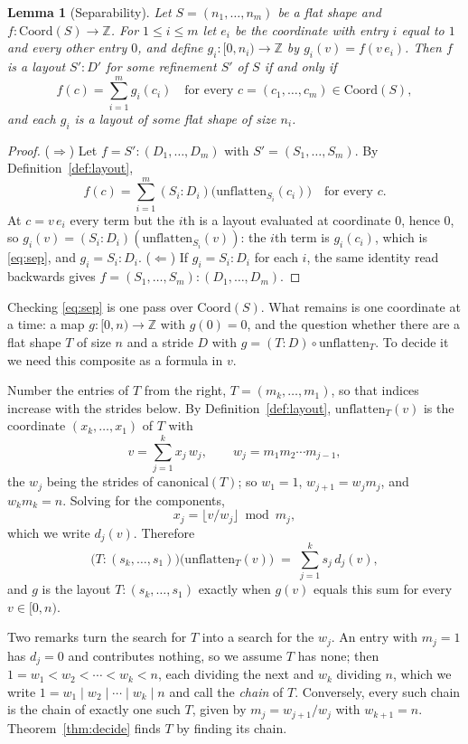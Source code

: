\documentclass[11pt]{article}
\newtheorem{lemma}{Lemma}
\theoremstyle{definition}
\newcommand{\Z}{\mathbb{Z}}
\begin{document}
\begin{lemma}[Separability]\label{lem:separable}
Let $S = (n_1,\dots,n_m)$ be a flat shape and $f : \mathrm{Coord}(S) \to \Z$.
For $1 \le i \le m$ let $e_i$ be the coordinate with entry $i$ equal to $1$
and every other entry $0$, and define $g_i : [0,n_i) \to \Z$ by
$g_i(v) = f(v\,e_i)$. Then $f$ is a layout $S'{:}D'$ for some refinement $S'$
of $S$ if and only if
\begin{equation}\label{eq:sep}
f(c) = \sum_{i=1}^{m} g_i(c_i)
\quad\text{for every } c = (c_1,\dots,c_m) \in \mathrm{Coord}(S),
\end{equation}
and each $g_i$ is a layout of some flat shape of size $n_i$.
\end{lemma}
\begin{proof}
($\Rightarrow$) Let $f = S'{:}(D_1,\dots,D_m)$ with $S' = (S_1,\dots,S_m)$.
By Definition~\ref{def:layout},
\[
f(c) = \sum_{i=1}^{m} (S_i{:}D_i)\big(\mathrm{unflatten}_{S_i}(c_i)\big)
\quad\text{for every } c.
\]
At $c = v\,e_i$ every term but the $i$th is a layout evaluated at coordinate
$0$, hence $0$, so $g_i(v) = (S_i{:}D_i)(\mathrm{unflatten}_{S_i}(v))$: the
$i$th term is $g_i(c_i)$, which is \eqref{eq:sep}, and $g_i = S_i{:}D_i$.
($\Leftarrow$) If $g_i = S_i{:}D_i$ for each $i$, the same identity read
backwards gives $f = (S_1,\dots,S_m){:}(D_1,\dots,D_m)$.
\end{proof}

Checking \eqref{eq:sep} is one pass over $\mathrm{Coord}(S)$. What remains
is one coordinate at a time: a map $g : [0,n) \to \Z$ with $g(0) = 0$, and
the question whether there are a flat shape $T$ of size $n$ and a stride $D$
with $g = (T{:}D) \circ \mathrm{unflatten}_T$. To decide it we need this
composite as a formula in $v$.

Number the entries of $T$ from the right, $T = (m_k,\dots,m_1)$, so that
indices increase with the strides below. By Definition~\ref{def:layout},
$\mathrm{unflatten}_T(v)$ is the coordinate $(x_k,\dots,x_1)$ of $T$ with
\[
v = \sum_{j=1}^{k} x_j\, w_j, \qquad w_j = m_1 m_2 \cdots m_{j-1},
\]
the $w_j$ being the strides of $\mathrm{canonical}(T)$; so $w_1 = 1$,
$w_{j+1} = w_j m_j$, and $w_k m_k = n$. Solving for the components,
\[
x_j = \lfloor v / w_j \rfloor \bmod m_j,
\]
which we write $d_j(v)$. Therefore
\[
\big(T{:}(s_k,\dots,s_1)\big)\big(\mathrm{unflatten}_T(v)\big)
\;=\; \sum_{j=1}^{k} s_j\, d_j(v),
\]
and $g$ is the layout $T{:}(s_k,\dots,s_1)$ exactly when $g(v)$ equals this
sum for every $v \in [0,n)$.

Two remarks turn the search for $T$ into a search for the $w_j$. An entry
with $m_j = 1$ has $d_j = 0$ and contributes nothing, so we assume $T$ has
none; then $1 = w_1 < w_2 < \cdots < w_k < n$, each dividing the next and
$w_k$ dividing $n$, which we write $1 = w_1 \mid w_2 \mid \cdots \mid w_k
\mid n$ and call the \emph{chain} of $T$. Conversely, every such chain is
the chain of exactly one such $T$, given by $m_j = w_{j+1}/w_j$ with
$w_{k+1} = n$. Theorem~\ref{thm:decide} finds $T$ by finding its chain.
\end{document}

